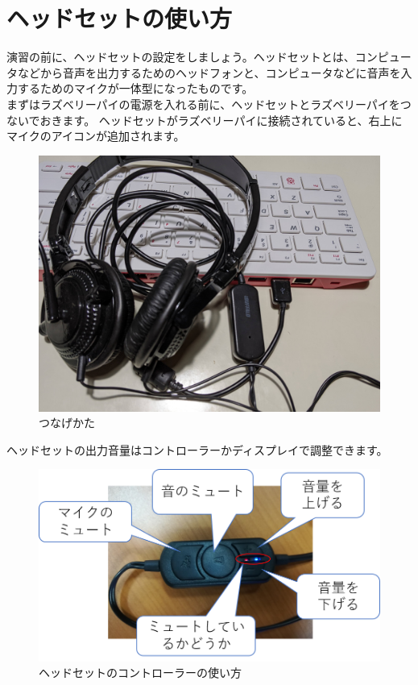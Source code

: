 \section{ヘッドセットの使い方}
演習の前に、ヘッドセットの設定をしましょう。ヘッドセットとは、コンピュータなどから音声を出力するためのヘッドフォンと、コンピュータなどに音声を入力するためのマイクが一体型になったものです。\\
まずはラズベリーパイの電源を入れる前に、ヘッドセットとラズベリーパイをつないでおきます。
ヘッドセットがラズベリーパイに接続されていると、右上にマイクのアイコンが追加されます。

\begin{figure}[H]
\begin{center}
    \includegraphics[width=\linewidth]{images/how_to_connect_headset.jpg}
    \caption{つなげかた}
    \label{つなげかた}
\end{center}
\end{figure}

ヘッドセットの出力音量はコントローラーかディスプレイで調整できます。

\begin{figure}[H]
\begin{center}
    \includegraphics[width=\linewidth]{images/chap06/text06-img004.png}
    \caption{ヘッドセットのコントローラーの使い方}
    \label{ヘッドセットのコントローラーの使い方}
\end{center}
\end{figure}

